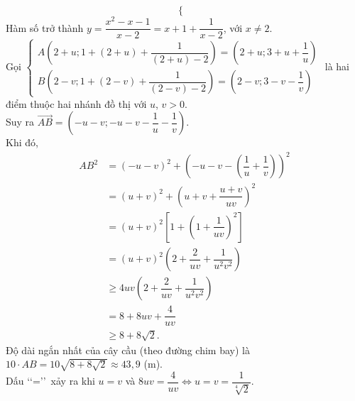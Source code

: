 \begin{bt}
{\[\begin{cases}
	\end{cases}
	\] 
	Hàm số trở thành $y=\dfrac{x^2-x-1}{x-2}=x+1+\dfrac{1}{x-2}$, với $x\neq  2$.\\
	Gọi $\begin{cases}A\left(2+u; 1+(2+u)+\dfrac{1}{(2+u)-2}\right) = \left(2+u; 3+u+\dfrac{1}{u}\right)\\B\left(2-v; 1+(2-v)+\dfrac{1}{(2-v)-2}\right) = \left(2-v; 3-v-\dfrac{1}{v}\right)
	\end{cases}$ là hai điểm thuộc hai nhánh đồ thị với $u$, $v>0$.\\
	 Suy ra $\overrightarrow{AB}=\left(-u-v; -u-v-\dfrac{1}{u}-\dfrac{1}{v}\right)$.\\
	 Khi đó,
	\begin{align*}
		 AB^2&=(-u-v)^2 + \left(-u-v-\left(\dfrac{1}{u}+\dfrac{1}{v}\right)\right)^2 \\
		&= (u+v)^2 +  \left(u+v+\dfrac{u+v}{uv}\right)^2 \\
		&= (u+v)^2\left[1+\left(1+\dfrac{1}{uv}\right)^2\right] \\ 
		&=(u+v)^2\left(2+\dfrac{2}{uv}+\dfrac{1}{u^2v^2}\right) \\ 
		 &\geq4uv\left(2+\dfrac{2}{uv}+\dfrac{1}{u^2v^2}\right) \\
		 &=8+8uv+\dfrac{4}{uv} \\
		 &\geq8+8\sqrt{2}.
	\end{align*}
	Độ dài ngắn nhất của cây cầu (theo đường chim bay) là $10 \cdot AB = 10\sqrt{8+8\sqrt{2}}\approx 43{,}9$ (m).\\ 
	Dấu \lq\lq=\rq\rq~xảy ra khi  $u=v$ và $8uv=\dfrac{4}{uv}\Leftrightarrow u=v=\dfrac{1}{\sqrt[4]{2}}$.\\
} 
\end{bt}

